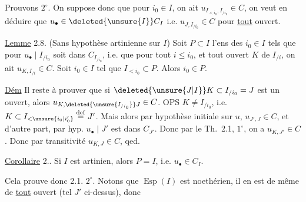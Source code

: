
Prouvons $2^\circ$. On suppose donc que pour  $i_0\in I$, on ait $u_{I_{<i_0},I_{/i_0}}\in C$, on veut en déduire que $u_\bullet\in\deleted{\unsure{I}}C_I$ i.e. $u_{J,I_{/i_0}}\in C$ pour \uline{tout} ouvert. 

\uline{Lemme} 2.8. (Sans hypothèse artinienne sur $I$) Soit $P\subset I$ l'ens des $i_0\in I$ tels que pour  $u_\bullet\mid I_{/i_0}$ soit dans $C_{I_{/i_0}}$, i.e. que pour tout $i\le i_0$, et tout ouvert $K$ de $I_{/i}$, on ait $u_{K,I_{/i}}\in C$.  Soit $i_0\in I$ tel que $I_{<i_0}\subset P$. Alors $i_0\in P$.

\uline{Dém} Il reste à prouver que si $\deleted{\unsure{J|I}}K\subset I_{/i_0}=J$ est un ouvert, alors $u_{K,\deleted{\unsure{I_{/i_0}}}J}\in C$. OPS $K\ne I_{/i_0}$, i.e. $K\subset I_{<\unsure{i_0|i'_0}}\overset{\mathrm{def}}{=}J'$. Mais alors par hypothèse initiale sur $u$,  $u_{J',J}\in C$, et d'autre part,  par hyp. $u_\bullet\mid J'$ est dans $C_{J'}$. Donc par le Th.\ 2.1, $1^\circ$, on a $u_{K,J'}\in C$. Donc par transitivité $u_{K,J}\in C$, qed.

\uline{Corollaire} 2.. Si $I$ est artinien, alors $P=I$, i.e. $u_\bullet\in C_I$.

Cela prouve donc 2.1. $2^\circ$. Notons que $\operatorname{Esp}(I)$ est noethérien, il en est de même de \uline{tout} ouvert (tel $J'$ ci-dessus), donc


